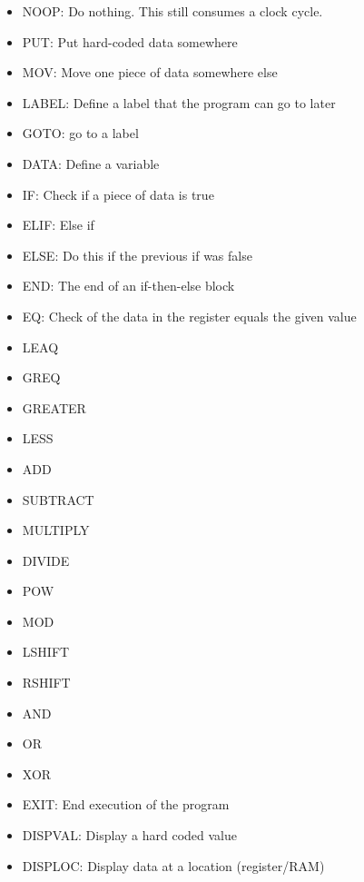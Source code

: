 \documentclass[12pt]{article}
\begin{document}
\begin{itemize}

\item
NOOP: Do nothing. This still consumes a clock cycle.

\item
PUT: Put hard-coded data somewhere

\item
MOV: Move one piece of data somewhere else

\item
LABEL: Define a label that the program can go to later

\item
GOTO: go to a label

\item
DATA: Define a variable

\item
IF: Check if a piece of data is true

\item
ELIF: Else if

\item
ELSE: Do this if the previous if was false

\item
END: The end of an if-then-else block

\item
EQ: Check of the data in the register equals the given value

\item
LEAQ

\item
GREQ

\item
GREATER

\item
LESS

\item
ADD

\item
SUBTRACT

\item
MULTIPLY

\item
DIVIDE

\item
POW

\item
MOD

\item
LSHIFT

\item
RSHIFT

\item
AND

\item
OR

\item
XOR

\item
EXIT: End execution of the program

\item
DISPVAL: Display a hard coded value

\item
DISPLOC: Display data at a location (register/RAM)

\end{itemize}
\end{document}
